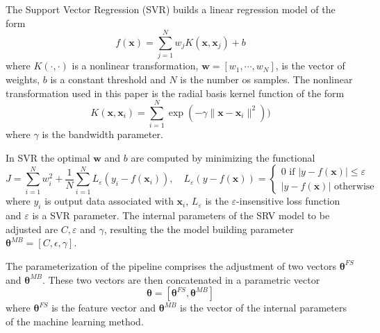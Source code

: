 \documentclass[a4paper,12pt, english]{article}
\newcommand{\w}{\mathbf{w}}
\newcommand{\x}{\mathbf{x}}
\newcommand{\xp}{\bm{\theta}}
\newcommand{\xfs}{\xp^{FS}}
\newcommand{\xmb}{\xp^{MB}}
\begin{document}
The Support Vector Regression (SVR)  builds a linear regression model of the form
\[
f(\x) = \sum_{j=1}^{N} w_j K(\x,\x_j) + b\]
where $K(\cdot, \cdot) $ is a nonlinear transformation, $\w = [w_1, \cdots, w_N]$, is the vector of weights, $b$ is  a constant threshold and $N$ is the number os samples.
The  nonlinear transformation used in this paper is the radial basis kernel function of the form 
\begin{equation}
 \label{eq:svr-kernel}
K(\x,\x_i) = \sum_{i=1}^{N} \exp(-\gamma \|\x-\x_i\|^2) )
\end{equation}
% 
where $\gamma$ is the bandwidth parameter.

In SVR the optimal $\w$ and $b$ are computed by minimizing the functional \cite{katayoun:2020}
\[
J = \sum_{i=1}^{N} w_i^2 +  \frac{1}{N} \sum_{i=1}^{N} L_{\varepsilon} ( y_i - f(\x_i) ), \quad
L_{\varepsilon}(y - f(\x))=
\begin{cases}
  0           \mbox{ if } |y - f(\x)|\le \varepsilon\\
  |y - f(\x)|  \mbox{ otherwise }
\end{cases}
\]
where 
$y_i$ is output data associated with $\x_i$, $ L_{\varepsilon}$ is the $\varepsilon$-insensitive loss function \cite{gunn:1998} and $\varepsilon$ is a SVR parameter. 
The internal parameters of the SRV model to be adjusted are $C, \varepsilon$ and $\gamma$, resulting the the model building parameter $\xmb = [ {C}, {\epsilon}, {\gamma}]$.


The parameterization of the pipeline comprises the adjustment of two vectors  $\xfs$ and $\xmb$. These two vectors are then concatenated in a parametric vector
\[ \xp = [ \xfs,  \xmb ] \]
where $\xfs$ is the feature vector and  $\xmb$ is the vector of the internal parameters of the machine learning method.
 
\end{document}
